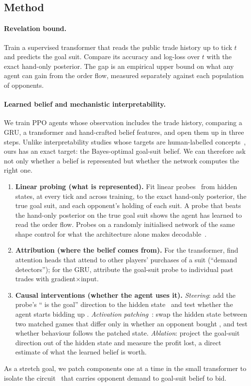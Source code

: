 \documentclass{article}
\newcommand{\Club}{\ding{168}}
\begin{document}
\subsection{Method}
\paragraph{Revelation bound.}
Train a supervised transformer that reads the public trade history up to tick $t$ and predicts the goal suit.
Compare its accuracy and log-loss over $t$ with the exact hand-only posterior.
The gap is an empirical upper bound on what any agent can gain from the order flow, measured separately against each population of opponents.

\paragraph{Learned belief and mechanistic interpretability.}
We train PPO agents whose observation includes the trade history, comparing a GRU, a transformer and hand-crafted belief features, and open them up in three steps. Unlike interpretability studies whose targets are human-labelled concepts~\cite{alphazero_probe,othello}, ours has an exact target: the Bayes-optimal goal-suit belief. We can therefore ask not only whether a belief is represented but whether the network computes the right one.
\begin{enumerate}[leftmargin=*,itemsep=2pt]
  \item \textbf{Linear probing (what is represented).} Fit linear probes~\cite{probes} from hidden states, at every tick and across training, to the exact hand-only posterior, the true goal suit, and each opponent's holding of each suit. A probe that beats the hand-only posterior on the true goal suit shows the agent has learned to read the order flow. Probes on a randomly initialised network of the same shape control for what the architecture alone makes decodable~\cite{control_tasks}.
  \item \textbf{Attribution (where the belief comes from).} For the transformer, find attention heads that attend to other players' purchases of a suit (``demand detectors''); for the GRU, attribute the goal-suit probe to individual past trades with gradient$\times$input.
  \item \textbf{Causal interventions (whether the agent uses it).} \emph{Steering}: add the probe's ``\Club{} is the goal'' direction to the hidden state~\cite{actadd} and test whether the agent starts bidding up \Club. \emph{Activation patching}~\cite{rome}: swap the hidden state between two matched games that differ only in whether an opponent bought \Club, and test whether behaviour follows the patched state. \emph{Ablation}: project the goal-suit direction out of the hidden state and measure the profit lost, a direct estimate of what the learned belief is worth.
\end{enumerate}
As a stretch goal, we patch components one at a time in the small transformer to isolate the circuit~\cite{circuits} that carries opponent demand to goal-suit belief to bid.
\end{document}
